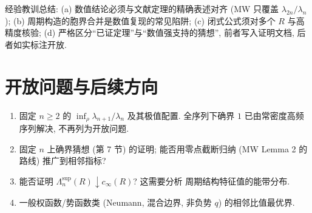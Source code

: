 \documentclass[UTF8]{ctexart}
\begin{document}
经验教训总结: (a) 数值结论必须与文献定理的精确表述对齐 (MW 只覆盖 $\lambda_{2n}/\lambda_n$);
(b) 周期构造的胞界合并是数值复现的常见陷阱; (c) 闭式公式须对多个 $R$ 与高精度核验;
(d) 严格区分``已证定理''与``数值强支持的猜想'', 前者写入证明文档, 后者如实标注开放.

\section{开放问题与后续方向}

\begin{enumerate}
	\item 固定 $n\ge2$ 的 $\inf_{\rho}\lambda_{n+1}/\lambda_n$ 及其极值配置.
		全序列下确界 $1$ 已由常密度高频序列解决, 不再列为开放问题.
	\item 固定 $n$ 上确界猜想 (第 7 节) 的证明; 能否用零点截断归纳 (MW Lemma 2 的路线) 推广到相邻指标?
	\item 能否证明 $\Lambda_n^{\sup}(R) \downarrow c_{\infty}(R)$? 这需要分析
		周期结构特征值的能带分布.
	\item 一般权函数/势函数类 (Neumann, 混合边界, 非负势 $q$) 的相邻比值最优界.
\end{enumerate}
\end{document}
